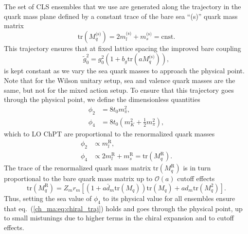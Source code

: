 The set of CLS ensembles that we use are generated along the trajectory in the quark mass plane defined by a constant trace of the bare sea ``(s)'' quark mass matrix
\begin{equation}
\label{ch_ma:eq:chiral_traj}
{\textrm{tr}}\left(M_q^{\textrm{(s)}}\right)=2m_l^{\textrm{(s)}}+m_s^{\textrm{(s)}}={\textrm{cnst}}.
\end{equation}
This trajectory ensures that at fixed lattice spacing the improved bare coupling 
\begin{equation}
\tilde{g}_0^2=g_0^2\left(1+b_g{\textrm{tr}}\left(aM_q^{\textrm{(s)}}\right)\right),
\end{equation}
is kept constant as we vary the sea quark masses to approach the physical point. Note that for the Wilson unitary setup, sea and valence quark masses are the same, but not for the mixed action setup. To ensure that this trajectory goes through the physical point, we define the dimensionless quantities
\begin{align}
\label{ch_ma:eq:phis}
\phi_2&=8t_0m_{\pi}^2,\\
\phi_4&=8t_0\left(m_K^2+\frac{1}{2}m_{\pi}^2\right),
\end{align}
which to LO ChPT are proportional to the renormalized quark masses
\begin{align}
\phi_2&\propto m_l^{\textrm{R}},\\
\phi_4&\propto2m_l^{\textrm{R}}+m_s^{\textrm{R}}={\textrm{tr}}\left(M_q^{\textrm{R}}\right).
\end{align}
The trace of the renormalized quark mass matrix ${\textrm{tr}}\left(M_q^{\textrm{R}}\right)$ is in turn proportional to the bare quark mass matrix up to $\mathcal{O}(a)$ cutoff effects
\begin{equation}
{\textrm{tr}}\left(M_q^{\textrm{R}}\right)=Z_mr_m\left[\left(1+a\bar{d}_m{\textrm{tr}}\left(M_q\right)\right){\textrm{tr}}\left(M_q\right)+ad_m{\textrm{tr}}\left(M_q^2\right)\right].
\end{equation}
Thus, setting the sea value of $\phi_4$ to its physical value for all ensembles ensure that eq.~(\ref{ch_ma:eq:chiral_traj}) holds and goes through the physical point, up to small mistunings due to higher terms in the chiral expansion and to cutoff effects. 

